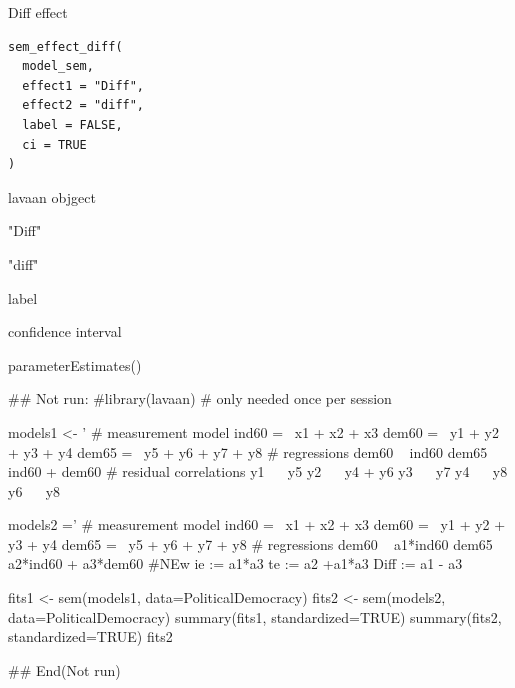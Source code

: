 \documentclass[a4paper]{book}
\begin{document}
%
\begin{Description}
Diff effect
\end{Description}
%
\begin{Usage}
\begin{verbatim}
sem_effect_diff(
  model_sem,
  effect1 = "Diff",
  effect2 = "diff",
  label = FALSE,
  ci = TRUE
)
\end{verbatim}
\end{Usage}
%
\begin{Arguments}
\begin{ldescription}
\item[\code{model\_sem}] lavaan objgect

\item[\code{effect1}] "Diff"

\item[\code{effect2}] "diff"

\item[\code{label}] label

\item[\code{ci}] confidence interval
\end{ldescription}
\end{Arguments}
%
\begin{Value}
parameterEstimates()
\end{Value}
%
\begin{Examples}
\begin{ExampleCode}

\#\# Not run: 
#library(lavaan) # only needed once per session

models1 <- '
  # measurement model
    ind60 =~ x1 + x2 + x3
    dem60 =~ y1 + y2 + y3 + y4
    dem65 =~ y5 + y6 + y7 + y8
    # regressions
    dem60 ~ ind60
    dem65 ~ ind60 + dem60
      # residual correlations
    y1 ~~ y5
    y2 ~~ y4 + y6
    y3 ~~ y7
    y4 ~~ y8
    y6 ~~ y8

models2 ='
  # measurement model
    ind60 =~ x1 + x2 + x3
    dem60 =~ y1 + y2 + y3 + y4
    dem65 =~ y5 + y6 + y7 + y8
     # regressions
    dem60 ~ a1*ind60
    dem65 ~ a2*ind60 + a3*dem60
 #NEw
   ie := a1*a3
   te := a2 +a1*a3
   Diff := a1 - a3




fits1 <- sem(models1, data=PoliticalDemocracy)
fits2 <- sem(models2, data=PoliticalDemocracy)
summary(fits1, standardized=TRUE)
summary(fits2, standardized=TRUE)
fits2 %

## End(Not run)
\end{ExampleCode}
\end{Examples}
\end{document}
